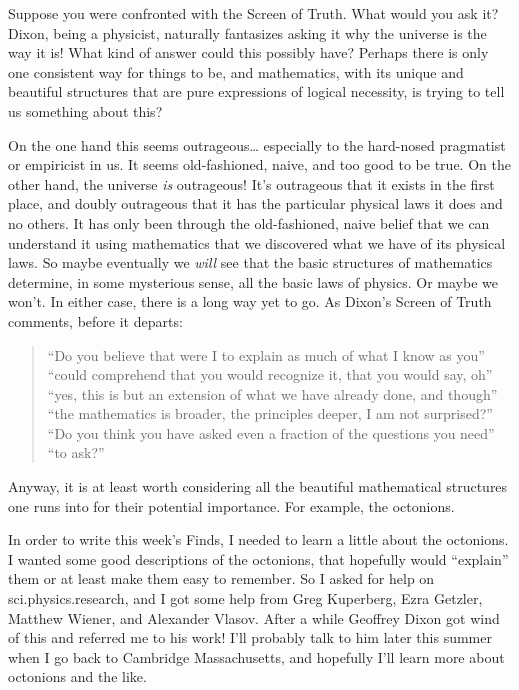 \documentclass{article}
\begin{document}
Suppose you were confronted with the Screen of Truth. What would you ask
it? Dixon, being a physicist, naturally fantasizes asking it why the
universe is the way it is! What kind of answer could this possibly have?
Perhaps there is only one consistent way for things to be, and
mathematics, with its unique and beautiful structures that are pure
expressions of logical necessity, is trying to tell us something about
this?

On the one hand this seems outrageous\ldots{} especially to the
hard-nosed pragmatist or empiricist in us. It seems old-fashioned,
naive, and too good to be true. On the other hand, the universe
\emph{is} outrageous! It's outrageous that it exists in the first place,
and doubly outrageous that it has the particular physical laws it does
and no others. It has only been through the old-fashioned, naive belief
that we can understand it using mathematics that we discovered what we
have of its physical laws. So maybe eventually we \emph{will} see that
the basic structures of mathematics determine, in some mysterious sense,
all the basic laws of physics. Or maybe we won't. In either case, there
is a long way yet to go. As Dixon's Screen of Truth comments, before it
departs:

\begin{quote}
``Do you believe that were I to explain as much of what I know as you''
``could comprehend that you would recognize it, that you would say, oh''
``yes, this is but an extension of what we have already done, and
though'' ``the mathematics is broader, the principles deeper, I am not
surprised?'' ``Do you think you have asked even a fraction of the
questions you need'' ``to ask?''
\end{quote}

Anyway, it is at least worth considering all the beautiful mathematical
structures one runs into for their potential importance. For example,
the octonions.

In order to write this week's Finds, I needed to learn a little about
the octonions. I wanted some good descriptions of the octonions, that
hopefully would ``explain'' them or at least make them easy to remember.
So I asked for help on sci.physics.research, and I got some help from
Greg Kuperberg, Ezra Getzler, Matthew Wiener, and Alexander Vlasov.
After a while Geoffrey Dixon got wind of this and referred me to his
work! I'll probably talk to him later this summer when I go back to
Cambridge Massachusetts, and hopefully I'll learn more about octonions
and the like.
\end{document}

